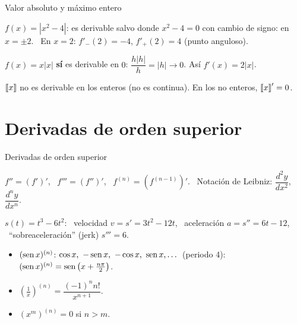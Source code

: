 \documentclass[10pt,aspectratio=169]{beamer}
\begin{document}
\begin{frame}{Valor absoluto y máximo entero}
  \begin{ejemplo}[7]
    $f(x)=|x^2-4|$: es derivable salvo donde $x^2-4=0$ con cambio de signo: en $x=\pm2$.
    \ En $x=2$: $f'_-(2)=-4$, $f'_+(2)=4$ (punto anguloso).
  \end{ejemplo}
  \begin{ejemplo}[8]
    $f(x)=x|x|$ \textbf{sí} es derivable en $0$: $\dfrac{h|h|}{h}=|h|\to0$. Así $f'(x)=2|x|$.
  \end{ejemplo}
  \begin{ejemplo}[9]
    $\left\llbracket x\right\rrbracket$ no es derivable en los enteros (no es continua). En los no enteros, $\left\llbracket x\right\rrbracket'=0$.
  \end{ejemplo}
  \begin{center}
    \quad
  \end{center}
\end{frame}

\section{Derivadas de orden superior}

\begin{frame}{Derivadas de orden superior}
  \begin{definicion}
    $f''=(f')'$, \ $f'''=(f'')'$, \ $f^{(n)}=\left(f^{(n-1)}\right)'$. \ Notación de Leibniz: $\dfrac{d^2y}{dx^2}$, $\dfrac{d^ny}{dx^n}$.
  \end{definicion}
  \begin{ejemplo}[10: física]
    $s(t)=t^3-6t^2$: \ velocidad $v=s'=3t^2-12t$, \ aceleración $a=s''=6t-12$, \ ``sobreaceleración'' (jerk) $s'''=6$.
  \end{ejemplo}
  \begin{ejemplo}[11: patrones]
    \begin{itemize}
      \item $(\operatorname{sen} x)^{(n)}$: $\cos x,\ -\operatorname{sen} x,\ -\cos x,\ \operatorname{sen} x,\dots$ (periodo 4): \ $(\operatorname{sen} x)^{(n)}=\operatorname{sen}\left(x+\frac{n\pi}2\right)$.
      \item $\left(\frac1x\right)^{(n)}=\dfrac{(-1)^nn!}{x^{n+1}}$.
      \item $(x^m)^{(n)}=0$ si $n>m$.
    \end{itemize}
  \end{ejemplo}
\end{frame}
\end{document}
